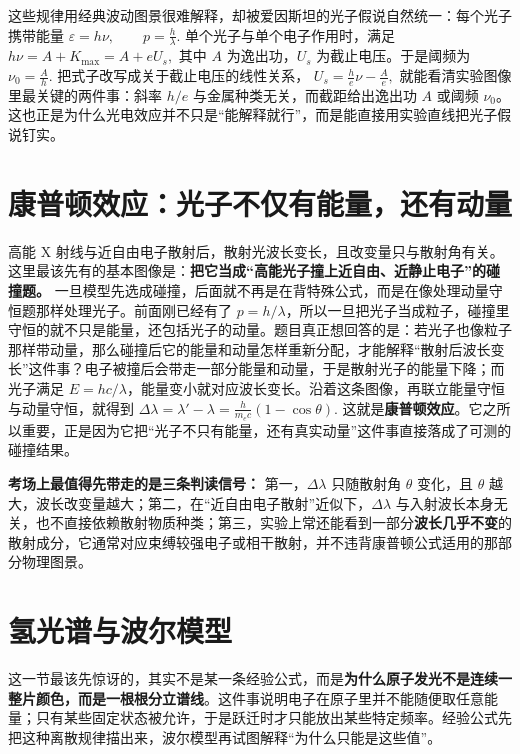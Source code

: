 \documentclass[lang=cn,11pt]{elegantbook}
\begin{document}
这些规律用经典波动图景很难解释，却被爱因斯坦的光子假说自然统一：每个光子携带能量
 \(\varepsilon=h\nu, \qquad p=\frac{h}{\lambda}.\) 
单个光子与单个电子作用时，满足
 \(h\nu=A+K_{\max}=A+eU_s,\) 
其中 \(A\) 为逸出功，\(U_s\) 为截止电压。于是阈频为
 \(\nu_0=\frac{A}{h}.\) 
把式子改写成关于截止电压的线性关系，
 \(U_s=\frac{h}{e}\nu-\frac{A}{e},\) 
就能看清实验图像里最关键的两件事：斜率 \(h/e\) 与金属种类无关，而截距给出逸出功 \(A\) 或阈频 \(\nu_0\)。这也正是为什么光电效应并不只是“能解释就行”，而是能直接用实验直线把光子假说钉实。

\section{康普顿效应：光子不仅有能量，还有动量}

高能 X 射线与近自由电子散射后，散射光波长变长，且改变量只与散射角有关。这里最该先有的基本图像是：\textbf{把它当成“高能光子撞上近自由、近静止电子”的碰撞题。} 一旦模型先选成碰撞，后面就不再是在背特殊公式，而是在像处理动量守恒题那样处理光子。前面刚已经有了 \(p=h/\lambda\)，所以一旦把光子当成粒子，碰撞里守恒的就不只是能量，还包括光子的动量。题目真正想回答的是：若光子也像粒子那样带动量，那么碰撞后它的能量和动量怎样重新分配，才能解释“散射后波长变长”这件事？电子被撞后会带走一部分能量和动量，于是散射光子的能量下降；而光子满足 \(E=hc/\lambda\)，能量变小就对应波长变长。沿着这条图像，再联立能量守恒与动量守恒，就得到
 \(\Delta \lambda =\lambda'-\lambda =\frac{h}{m_ec}(1-\cos\theta).\) 
这就是\textbf{康普顿效应}。它之所以重要，正是因为它把“光子不只有能量，还有真实动量”这件事直接落成了可测的碰撞结果。

\begin{remark}
\textbf{考场上最值得先带走的是三条判读信号：} 第一，\(\Delta\lambda\) 只随散射角 \(\theta\) 变化，且 \(\theta\) 越大，波长改变量越大；第二，在“近自由电子散射”近似下，\(\Delta\lambda\) 与入射波长本身无关，也不直接依赖散射物质种类；第三，实验上常还能看到一部分\textbf{波长几乎不变}的散射成分，它通常对应束缚较强电子或相干散射，并不违背康普顿公式适用的那部分物理图景。
\end{remark}

\section{氢光谱与波尔模型}

这一节最该先惊讶的，其实不是某一条经验公式，而是\textbf{为什么原子发光不是连续一整片颜色，而是一根根分立谱线}。这件事说明电子在原子里并不能随便取任意能量；只有某些固定状态被允许，于是跃迁时才只能放出某些特定频率。经验公式先把这种离散规律描出来，波尔模型再试图解释“为什么只能是这些值”。
\end{document}
